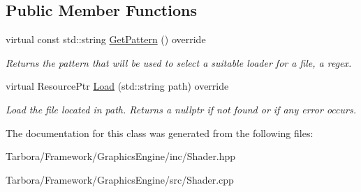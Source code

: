 \subsection*{Public Member Functions}
\begin{DoxyCompactItemize}
\item 
\mbox{\label{classTarbora_1_1ShaderResourceLoader_a511afa6f59bb08232170c0a171d64ed9}} 
virtual const std\+::string \hyperlink{classTarbora_1_1ShaderResourceLoader_a511afa6f59bb08232170c0a171d64ed9}{Get\+Pattern} () override
\begin{DoxyCompactList}\small\item\em Returns the pattern that will be used to select a suitable loader for a file, a regex. \end{DoxyCompactList}\item 
\mbox{\label{classTarbora_1_1ShaderResourceLoader_a79327c2a0baa86144489afcec327bf0a}} 
virtual Resource\+Ptr \hyperlink{classTarbora_1_1ShaderResourceLoader_a79327c2a0baa86144489afcec327bf0a}{Load} (std\+::string path) override
\begin{DoxyCompactList}\small\item\em Load the file located in {\itshape path}. Returns a nullptr if not found or if any error occurs. \end{DoxyCompactList}\end{DoxyCompactItemize}


The documentation for this class was generated from the following files\+:\begin{DoxyCompactItemize}
\item 
Tarbora/\+Framework/\+Graphics\+Engine/inc/Shader.\+hpp\item 
Tarbora/\+Framework/\+Graphics\+Engine/src/Shader.\+cpp\end{DoxyCompactItemize}
